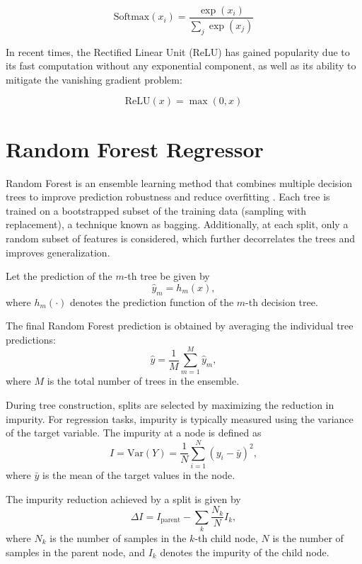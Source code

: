 \begin{equation}
\text{Softmax}(x_i) = \frac{\exp(x_i)}{\sum_j \exp(x_j)}
\end{equation}

In recent times, the Rectified Linear Unit (ReLU) has gained popularity due to its fast computation without any exponential component, as well as its ability to mitigate the vanishing gradient problem:

\begin{equation}
\text{ReLU}(x) = \max(0, x)
\end{equation}


\section{Random Forest Regressor}

Random Forest is an ensemble learning method that combines multiple decision trees to improve prediction robustness and reduce overfitting \cite{breiman2001random}. Each tree is trained on a bootstrapped subset of the training data (sampling with replacement), a technique known as bagging. Additionally, at each split, only a random subset of features is considered, which further decorrelates the trees and improves generalization.

Let the prediction of the $m$-th tree be given by
\begin{equation}
\hat{y}_m = h_m(x),
\end{equation}
where $h_m(\cdot)$ denotes the prediction function of the $m$-th decision tree.

The final Random Forest prediction is obtained by averaging the individual tree predictions:
\begin{equation}
\hat{y} = \frac{1}{M} \sum_{m=1}^{M} \hat{y}_m,
\end{equation}
where $M$ is the total number of trees in the ensemble.

During tree construction, splits are selected by maximizing the reduction in impurity. For regression tasks, impurity is typically measured using the variance of the target variable. The impurity at a node is defined as
\begin{equation}
I = \mathrm{Var}(Y) = \frac{1}{N} \sum_{i=1}^{N} (y_i - \bar{y})^2,
\end{equation}
where $\bar{y}$ is the mean of the target values in the node.

The impurity reduction achieved by a split is given by
\begin{equation}
\Delta I = I_{\text{parent}} - \sum_{k} \frac{N_k}{N} I_k,
\end{equation}
where $N_k$ is the number of samples in the $k$-th child node, $N$ is the number of samples in the parent node, and $I_k$ denotes the impurity of the child node.


